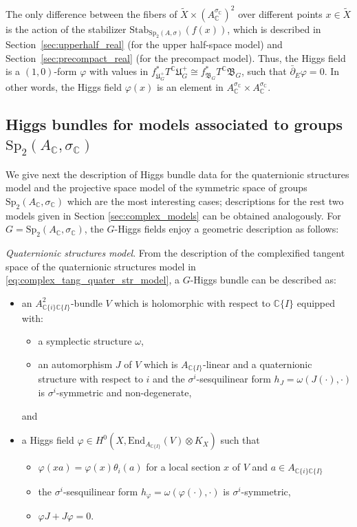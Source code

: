 \documentclass[oneside,11pt]{amsart}
\theoremstyle{definition}
\theoremstyle{remark}
\numberwithin{thm}{section}
\numberwithin{equation}{section}
\begin{document}
The only difference between the fibers of $\tilde X\times (A^{\sigma_\mathbb C}_\mathbb C)^2$ over different points $x\in\tilde X$ is the action of the stabilizer $\mathrm{Stab}_{\mathrm{Sp}_2(A,\sigma)}(f(x))$, which is described in Section~\ref{sec:upperhalf_real} (for the upper half-space model) and Section~\ref{sec:precompact_real} (for the precompact model). Thus, the Higgs field is a $(1,0)$-form $\varphi$ with values in $f_{\mathfrak{U}_G^+}^*T^\mathbb{C}\mathfrak{U}_G^+ \cong  f_{\mathfrak{B}_G}^*T^\mathbb{C}\mathfrak{B}_G$, such that $\bar\partial_E \varphi =0$. In other words, the Higgs field $\varphi(x)$ is an element in $A_\mathbb C^{\sigma_{\mathbb{C}}}\times A_\mathbb C^{\sigma_\mathbb C}$.

\subsection{Higgs bundles for models associated to groups \texorpdfstring{$\mathrm{Sp}_2(A_{\mathbb{C}}, \sigma_{\mathbb{C}})$}{}}\label{subsec:complex_defs}

We give next the description of Higgs bundle data for the quaternionic structures model and the projective space model of the symmetric space of groups $\mathrm{Sp}_2(A_{\mathbb{C}}, \sigma_{\mathbb{C}})$ which are the most interesting cases; descriptions for the rest two models given in Section \ref{sec:complex_models} can be obtained analogously. For $G=\mathrm{Sp}_2(A_{\mathbb{C}}, \sigma_{\mathbb{C}})$, the $G$-Higgs fields enjoy a geometric description as follows: 

\emph{Quaternionic structures model}.
    From the description of the complexified tangent space of the quaternionic structures model in \eqref{eq:complex_tang_quater_str_model}, a $G$-Higgs bundle can be described as: 
    \begin{itemize}
        \item an $A^2_{\mathbb{C}\{i\}\mathbb C\{I\}}$-bundle $V$ which is holomorphic with respect to $\mathbb C\{I\}$ equipped with:
        \begin{itemize}
            \item a symplectic structure $\omega$,
            \item an automorphism $J$ of $V$ which is $A_{\mathbb C\{I\}}$-linear and a quaternionic structure with respect to $i$ and the $\sigma^i$-sesquilinear form $h_J=\omega(J(\cdot),\cdot)$ is $\sigma^i$-symmetric and non-degenerate,
        \end{itemize}
        and
        \item a Higgs field $\varphi\in H^0(X,\mathrm{End}_{A_{\mathbb C\{I\}}}(V)\otimes K_X)$ such that 
        \begin{itemize}
            \item $\varphi(xa)=\varphi(x)\theta_i(a)$ for a local section $x$ of $V$ and $a\in A_{\mathbb{C}\{i\}\mathbb C\{I\}}$
            \item the $\sigma^i$-sesquilinear form $h_\varphi=\omega(\varphi(\cdot),\cdot)$ is $\sigma^i$-symmetric,  
            \item $\varphi J+J\varphi=0$.
        \end{itemize}
\end{itemize}
\end{document}
